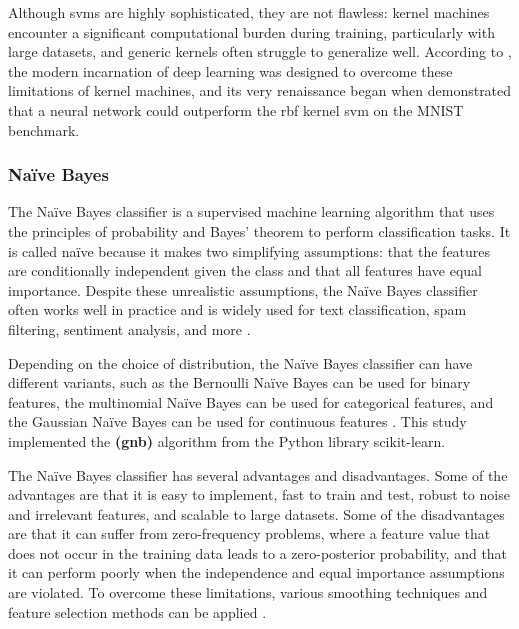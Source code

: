 Although \gls{svm}s are highly sophisticated, they are not flawless: kernel machines encounter a significant computational burden during training, particularly with large datasets, and generic kernels often struggle to generalize well. According to \textcite{Goodfellow2016}, the modern incarnation of deep learning was designed to overcome these limitations of kernel machines, and its very renaissance began when \textcite{Hinton2006} demonstrated that a neural network could outperform the \gls{rbf} kernel \gls{svm} on the MNIST benchmark.


\subsubsection{Naïve Bayes}
\label{subsubsec:machine_learning_GNB}

The Naïve Bayes classifier is a supervised machine learning algorithm that uses the principles of probability and Bayes' theorem to perform classification tasks. It is called naïve because it makes two simplifying assumptions: that the features are conditionally independent given the class and that all features have equal importance. Despite these unrealistic assumptions, the Naïve Bayes classifier often works well in practice and is widely used for text classification, spam filtering, sentiment analysis, and more \cite{Barber2012}.

Depending on the choice of distribution, the Naïve Bayes classifier can have different variants, such as the Bernoulli Naïve Bayes can be used for binary features, the multinomial Naïve Bayes can be used for categorical features, and the Gaussian Naïve Bayes can be used for continuous features \cite{Friedman1997}. This study implemented the \textbf{ (\gls{gnb})} algorithm from the Python library scikit-learn.

The Naïve Bayes classifier has several advantages and disadvantages. Some of the advantages are that it is easy to implement, fast to train and test, robust to noise and irrelevant features, and scalable to large datasets. Some of the disadvantages are that it can suffer from zero-frequency problems, where a feature value that does not occur in the training data leads to a zero-posterior probability, and that it can perform poorly when the independence and equal importance assumptions are violated. To overcome these limitations, various smoothing techniques and feature selection methods can be applied \cite{Wickramasinghe2021}.

